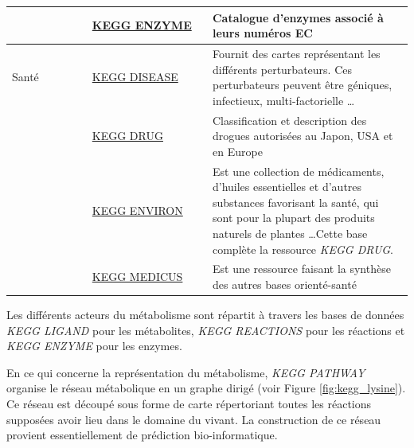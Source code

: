 \begin{refsegment}
\begin{table}
\begin{tabular}{p{0.2\linewidth}|p{0.3\linewidth}|p{0.5\linewidth}}
            \cline{2-3}             & \href{http://www.genome.jp/kegg/annotation/enzyme.html}{KEGG ENZYME}  & Catalogue d'enzymes associé à leurs numéros \gls{EC}\\
            \hline
            Santé                   & \href{http://www.genome.jp/kegg/disease/}{KEGG DISEASE}               & Fournit des cartes représentant les différents perturbateurs. Ces perturbateurs peuvent être géniques, infectieux, multi-factorielle \ldots\\
            \cline{2-3}             & \href{http://www.genome.jp/kegg/drug/}{KEGG DRUG}                     & Classification et description des drogues autorisées au Japon, USA et en Europe\\
            \cline{2-3}             & \href{http://www.genome.jp/kegg/drug/environ.html}{KEGG ENVIRON}      & Est une collection de médicaments, d'huiles essentielles et d'autres substances favorisant la santé, qui sont pour la plupart des produits naturels de plantes \ldots Cette base complète la ressource \textit{KEGG DRUG}.\\
            \cline{2-3}             & \href{http://www.genome.jp/kegg/medicus.html}{KEGG MEDICUS}           & Est une ressource faisant la synthèse des autres  bases orienté-santé \\
            \bottomrule
        \end{tabular}
    \end{table}
    
    
    Les différents acteurs du métabolisme sont répartit à travers les bases de données \textit{KEGG LIGAND} pour les métabolites, \textit{KEGG REACTIONS} pour les réactions et \textit{KEGG ENZYME} pour les enzymes.
    
    En ce qui concerne la représentation du métabolisme, \textit{KEGG PATHWAY} organise le réseau métabolique en un graphe dirigé (voir Figure \ref{fig:kegg_lysine}). Ce réseau est découpé sous forme de carte répertoriant toutes les réactions supposées avoir lieu dans le domaine du vivant. La construction de ce réseau provient essentiellement de prédiction bio-informatique.
    

\end{refsegment}
